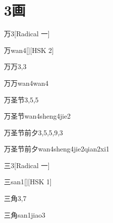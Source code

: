 
\section*{3画}

\begin{entry}{万}{3}[Radical 一]
  \begin{phonetics}{万}{wan4}[][HSK 2]
  \end{phonetics}
\end{entry}

\begin{entry}{万万}{3,3}
  \begin{phonetics}{万万}{wan4wan4}
  \end{phonetics}
\end{entry}

\begin{entry}{万圣节}{3,5,5}
  \begin{phonetics}{万圣节}{wan4sheng4jie2}
  \end{phonetics}
\end{entry}

\begin{entry}{万圣节前夕}{3,5,5,9,3}
  \begin{phonetics}{万圣节前夕}{wan4sheng4jie2qian2xi1}
  \end{phonetics}
\end{entry}

\begin{entry}{三}{3}[Radical 一]
  \begin{phonetics}{三}{san1}[][HSK 1]
  \end{phonetics}
\end{entry}

\begin{entry}{三角}{3,7}
  \begin{phonetics}{三角}{san1jiao3}
  \end{phonetics}
\end{entry}

